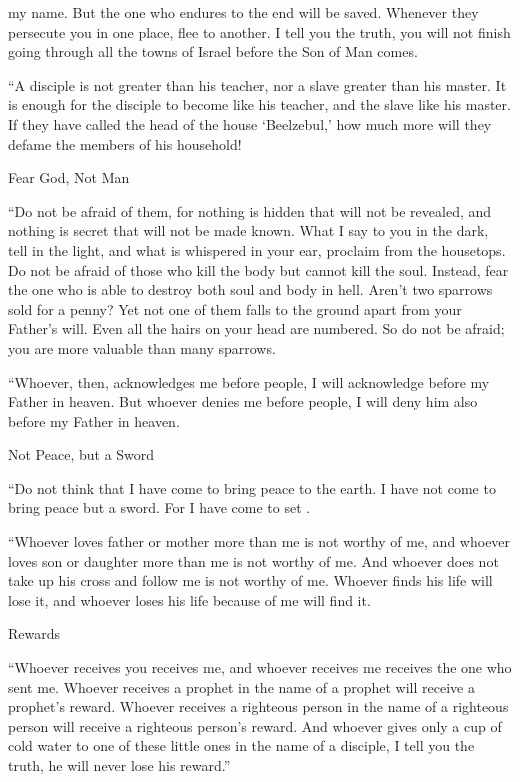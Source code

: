 {my
name.
But
the one who endures
to
the end
will be saved.
Whenever
they persecute
you
in
one place,
flee
to
another.
I tell
you
the truth,
you will
not
finish
going through all the towns
of Israel
before
the Son
of Man
comes.
\par }{\PP {}“A disciple
is
not
greater than
his teacher,
nor
a slave
greater than
his
master.
It is enough
for the disciple
to
become
like
his
teacher,
and
the slave
like
his
master.
If
they have called
the head of the house
‘Beelzebul,’
how much
more
will they defame the members of his
household!
\par }{\SH Fear God, Not Man
\par }{\PP {}“Do not
be afraid
of them,
for
nothing
is
hidden
that
will
not
be revealed,
and
nothing is secret
that
will
not
be made known.
What
I say
to you
in
the dark,
tell
in
the light,
and
what
is whispered
in your ear,
proclaim
from
the housetops.
Do not
be afraid
of those who kill
the body
but
cannot
kill
the soul.
Instead,
fear
the one who is able
to destroy
both
soul
and
body
in
hell.
Aren’t
two
sparrows
sold
for a penny? Yet
not
one
of
them
falls
to
the ground
apart from
your
Father’s will.
Even all
the hairs
on your
head
are
numbered.
So
do not
be afraid;
you
are more valuable
than many
sparrows.
\par }{\PP {}“Whoever,
then,
acknowledges
me
before
people,
I
will acknowledge
before
my
Father
in
heaven.
But
whoever
denies
me
before
people,
I
will deny
him
also
before
my
Father
in
heaven.
\par }{\SH Not Peace, but a Sword
\par }{\PP {}“Do not
think
that
I have come
to bring
peace
to
the earth.
I have
not
come
to bring
peace
but
a sword.
For
I have come
to set
{}
.
\par }{\PP {}“Whoever loves
father
or
mother
more than
me
is
not
worthy
of me,
and
whoever loves
son
or
daughter
more than
me
is
not
worthy
of me.
And
whoever
does not
take up
his
cross
and
follow
me
is
not
worthy
of me.
Whoever finds
his
life
will lose
it,
and
whoever loses
his
life
because of
me
will find
it.
\par }{\SH Rewards
\par }{\PP {}“Whoever receives
you
receives
me,
and
whoever receives
me
receives
the one who sent
me.
Whoever receives
a prophet
in
the name
of a prophet
will receive
a prophet’s
reward.
Whoever receives
a righteous person
in
the name
of a righteous person
will receive
a righteous person’s
reward.
And
whoever
gives
only
a cup
of cold water
to one
of these
little
ones in
the name
of a disciple,
I tell
you
the truth,
he will
never
lose
his
reward.”

}
